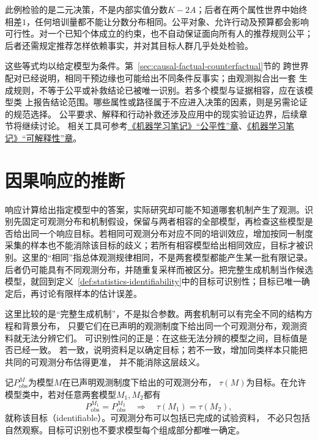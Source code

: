 此例检验的是二元决策，不是内部实值分数\(K-2A\)；后者在两个属性世界中始终
相差\(1\)，任何培训量都不能让分数分布相同。公平对象、允许行动及预算都会影响
可行性。对一个已知个体成立的约束，也不自动保证面向所有人的推荐规则公平；
后者还需规定推荐怎样依赖事实，并对其目标人群几乎处处检验。

这些等式均以给定模型为条件。第~\ref{sec:causal-factual-counterfactual}节的
跨世界配对已经说明，相同干预边缘也可能给出不同条件反事实；由观测拟合出一套
生成规则，不等于公平或补救结论已被唯一识别。若多个模型与证据相容，应在该模型类
上报告结论范围。哪些属性或路径属于不应进入决策的因素，则是另需论证的规范选择。
公平要求、解释和行动补救还涉及应用中的现实验证边界，后续章节将继续讨论。
相关工具可参考\href{https://github.com/shixiaogang/notes-on-machine-learning/blob/ff88d50e0edf94a815bc6e16e76ded414f406dc2/tex/06-foundations/03-trustworthiness/04-fairness.tex}{《机器学习笔记》“公平性”章}、\href{https://github.com/shixiaogang/notes-on-machine-learning/blob/ff88d50e0edf94a815bc6e16e76ded414f406dc2/tex/06-foundations/03-trustworthiness/06-interpretability.tex}{《机器学习笔记》“可解释性”章}。

\section{因果响应的推断}
\label{sec:causal-effect-identification}

响应计算给出指定模型中的答案，实际研究却可能不知道哪套机制产生了观测。识别先固定可观测分布和机制假设，保留与两者相容的全部模型，再检查这些模型是否给出同一个响应目标。若相同可观测分布对应不同的培训效应，增加按同一制度采集的样本也不能消除该目标的歧义；若所有相容模型给出相同效应，目标才被识别。这里的“相同”指总体观测规律相同，不是两套模型都能产生某一批有限记录。后者仍可能具有不同观测分布，并随重复采样而被区分。把完整生成机制当作候选模型，就回到定义~\ref{def:statistics-identifiability}中的目标可识别性；目标已唯一确定后，再讨论有限样本的估计误差。

这里比较的是“完整生成机制”，不是拟合参数。两套机制可以有完全不同的结构方程和背景分布，
只要它们在已声明的观测制度下给出同一个可观测分布，观测资料就无法分辨它们。
可识别性问的正是：在这些无法分辨的模型之间，目标值是否已经一致。
若一致，说明资料足以确定目标；若不一致，增加同类样本只能把共同的可观测分布估得更准，
并不能消除这层歧义。

记\(P_{\mathrm{obs}}^M\)为模型\(M\)在已声明观测制度下给出的可观测分布，
\(\tau(M)\)为目标。在允许模型类中，若对任意两套模型\(M_1,M_2\)都有
\[
  P_{\mathrm{obs}}^{M_1}=P_{\mathrm{obs}}^{M_2}
  \quad\Longrightarrow\quad \tau(M_1)=\tau(M_2),
\]
就称该目标（identifiable）。可观测分布可以包括已完成的试验资料，
不必只包括自然观察。目标可识别也不要求模型每个组成部分都唯一确定。

